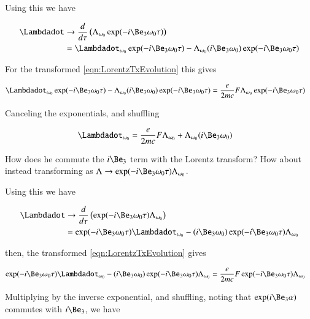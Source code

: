 \documentclass{article}
\begin{document}
Using this we have

\begin{align*}
\Lambdadot 
&\rightarrow \frac{d}{d\tau}\left(\Lambda_{\omega_0} \exp( -i \Be_3 \omega_0 \tau) \right) \\
&= \Lambdadot_{\omega_0} \exp( -i \Be_3 \omega_0 \tau) 
- \Lambda_{\omega_0} ( i \Be_3 \omega_0 ) \exp( -i \Be_3 \omega_0 \tau) 
\end{align*}

For the transformed \ref{eqn:LorentzTxEvolution} this gives

\begin{align*}
\Lambdadot_{\omega_0} \exp( -i \Be_3 \omega_0 \tau) 
- \Lambda_{\omega_0} ( i \Be_3 \omega_0 ) \exp( -i \Be_3 \omega_0 \tau) 
&= \frac{e}{2 m c} F \Lambda_{\omega_0} \exp( -i \Be_3 \omega_0 \tau)
\end{align*}

Canceling the exponentials, and shuffling

\begin{align}\label{eqn:firstTry}
\Lambdadot_{\omega_0} &= \frac{e}{2 m c} F \Lambda_{\omega_0} + \Lambda_{\omega_0} ( i \Be_3 \omega_0 ) 
\end{align}

How does he commute the $i\Be_3$ term with the Lorentz transform?  How about instead 
transforming as
$\Lambda \rightarrow \exp( -i \Be_3 \omega_0 \tau) \Lambda_{\omega_0}$.

Using this we have

\begin{align*}
\Lambdadot 
&\rightarrow \frac{d}{d\tau}\left(
\exp( -i \Be_3 \omega_0 \tau) 
\Lambda_{\omega_0} 
\right) \\
&= 
\exp( -i \Be_3 \omega_0 \tau) 
\Lambdadot_{\omega_0} 
- 
( i \Be_3 \omega_0 ) \exp( -i \Be_3 \omega_0 \tau) 
\Lambda_{\omega_0} 
\end{align*}

then, the transformed \ref{eqn:LorentzTxEvolution} gives

\begin{align*}
\exp( -i \Be_3 \omega_0 \tau) 
\Lambdadot_{\omega_0} 
- 
( i \Be_3 \omega_0 ) \exp( -i \Be_3 \omega_0 \tau) 
\Lambda_{\omega_0} 
&= \frac{e}{2 m c} F 
\exp( -i \Be_3 \omega_0 \tau)
\Lambda_{\omega_0} 
\end{align*}

Multiplying by the inverse exponential, and shuffling, noting that $\exp(i\Be_3\alpha)$ commutes with $i\Be_3$, we have
\end{document}
